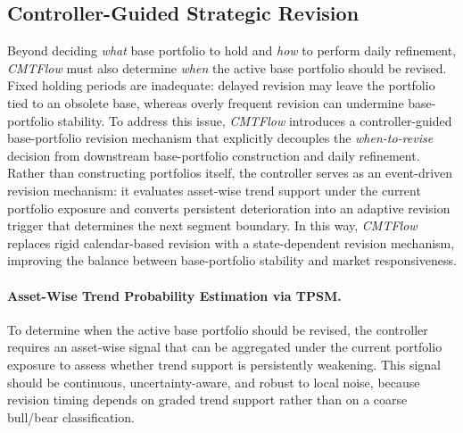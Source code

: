 \documentclass[letterpaper]{article} %
\begin{document}



\subsection{Controller-Guided Strategic Revision}

Beyond deciding \emph{what} base portfolio to hold and \emph{how} to perform daily refinement, \textit{CMTFlow} must also determine \emph{when} the active base portfolio should be revised. Fixed holding periods are inadequate: delayed revision may leave the portfolio tied to an obsolete base, whereas overly frequent revision can undermine base-portfolio stability. To address this issue, \textit{CMTFlow} introduces a controller-guided base-portfolio revision mechanism that explicitly decouples the \emph{when-to-revise} decision from downstream base-portfolio construction and daily refinement. Rather than constructing portfolios itself, the controller serves as an event-driven revision mechanism: it evaluates asset-wise trend support under the current portfolio exposure and converts persistent deterioration into an adaptive revision trigger that determines the next segment boundary. In this way, \textit{CMTFlow} replaces rigid calendar-based revision with a state-dependent revision mechanism, improving the balance between base-portfolio stability and market responsiveness.

\paragraph{Asset-Wise Trend Probability Estimation via TPSM.}
To determine when the active base portfolio should be revised, the controller requires an asset-wise signal that can be aggregated under the current portfolio exposure to assess whether trend support is persistently weakening. This signal should be continuous, uncertainty-aware, and robust to local noise, because revision timing depends on graded trend support rather than on a coarse bull/bear classification.
\end{document}
